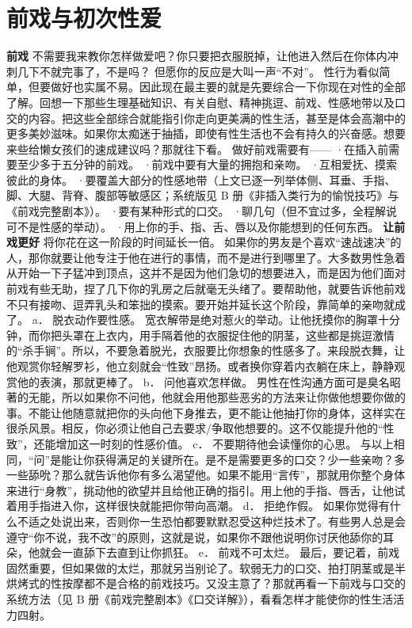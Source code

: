 \documentclass[12pt,UTF8,openany]{ctexbook}
\begin{document}
\section{前戏与初次性爱}
\textbf{前戏}
不需要我来教你怎样做爱吧？你只要把衣服脱掉，让他进入然后在你体内冲刺几下不就完事了，不是吗？
但愿你的反应是大叫一声“不对”。
性行为看似简单，但要做好也实属不易。因此现在最主要的就是先要综合一下你现在对性的全部了解。回想一下那些生理基础知识、有关自慰、精神挑逗、前戏、性感地带以及口交的内容。把这些全部综合就能指引你走向更美满的性生活，甚至是体会高潮中的更多美妙滋味。如果你太痴迷于抽插，即使有性生活也不会有持久的兴奋感。想要来些给懒女孩们的速成建议吗？那就往下看。
做好前戏需要有——
·在插入前需要至少多于五分钟的前戏。
·前戏中要有大量的拥抱和亲吻。
·互相爱抚、摸索彼此的身体。
·要覆盖大部分的性感地带（上文已逐一列举体侧、耳垂、手指、脚、大腿、背脊、腹部等敏感区；系统版见 B 册《非插入类行为的愉悦技巧》与《前戏完整剧本》）。
·要有某种形式的口交。
·聊几句（但不宜过多，全程解说可不是性感的举动）。
·用上你的手、指、舌、唇以及你能想到的任何东西。
\textbf{让前戏更好}
将你花在这一阶段的时间延长一倍。
如果你的男友是个喜欢“速战速决”的人，那你就要让他专注于他在进行的事情，而不是进行到哪里了。大多数男性急着从开始一下子猛冲到顶点，这并不是因为他们急切的想要进入，而是因为他们面对前戏有些无助，捏了几下你的乳房之后就毫无头绪了。要帮助他，就要告诉他前戏不只有接吻、逗弄乳头和笨拙的摸索。要开始并延长这个阶段，靠简单的亲吻就成了。
a． 脱衣动作要性感。
宽衣解带是绝对惹火的举动。让他抚摸你的胸罩十分钟，而你把头罩在上衣内，用手隔着他的衣服捉住他的阴茎，这些都是挑逗激情的“杀手锏”。所以，不要急着脱光，衣服要比你想象的性感多了。来段脱衣舞，让他观赏你轻解罗衫，他立刻就会“性致”昂扬。或者换你穿着内衣躺在床上，静静观赏他的表演，那就更棒了。
b． 问他喜欢怎样做。
男性在性沟通方面可是臭名昭著的无能，所以如果你不问他，他就会用他那些恶劣的方法来让你做他想要你做的事。不能让他随意就把你的头向他下身推去，更不能让他抽打你的身体，这样实在很杀风景。相反，你必须让他自己去要求/争取他想要的。这不仅能提升他的“性致”，还能增加这一时刻的性感价值。
c． 不要期待他会读懂你的心思。
与以上相同，“问”是能让你获得满足的关键所在。是不是需要更多的口交？少一些亲吻？多一些舔吮？那么就告诉他你有多么渴望他。如果不能用“言传”，那就用你整个身体来进行“身教”，挑动他的欲望并且给他正确的指引。用上他的手指、唇舌，让他试着用手指进入你，这样很快就能把你带向高潮。
d． 拒绝作假。
如果你觉得有什么不适之处说出来，否则你一生恐怕都要默默忍受这种烂技术了。有些男人总是会遵守“你不说，我不改”的原则，这就是说，如果你不跟他说明你讨厌他舔你的耳朵，他就会一直舔下去直到让你抓狂。
e． 前戏不可太烂。
最后，要记着，前戏固然重要，但如果做的太烂，那就另当别论了。软弱无力的口交、拍打阴茎或是半烘烤式的性按摩都不是合格的前戏技巧。又没主意了？那就再看一下前戏与口交的系统方法（见 B 册《前戏完整剧本》《口交详解》），看看怎样才能使你的性生活活力四射。
\end{document}
